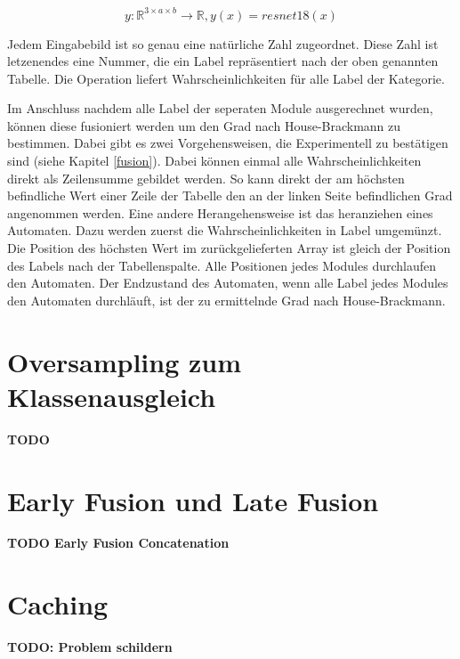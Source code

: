 \begin{equation}
y: \mathbb{R}^{3 \times a \times b} \to \mathbb{R}, y(x) = resnet18(x)
\end{equation}

Jedem Eingabebild ist so genau eine natürliche Zahl zugeordnet. Diese Zahl ist letzenendes eine Nummer, die ein Label repräsentiert nach der oben genannten Tabelle. Die Operation liefert Wahrscheinlichkeiten für alle Label der Kategorie.

Im Anschluss nachdem alle Label der seperaten Module ausgerechnet wurden, können diese fusioniert werden um den Grad nach House-Brackmann zu bestimmen. Dabei gibt es zwei Vorgehensweisen, die Experimentell zu bestätigen sind (siehe Kapitel \ref{fusion}). Dabei können einmal alle Wahrscheinlichkeiten direkt als Zeilensumme gebildet werden. So kann direkt der am höchsten befindliche Wert einer Zeile der Tabelle den an der linken Seite befindlichen Grad angenommen werden. Eine andere Herangehensweise ist das heranziehen eines Automaten. Dazu werden zuerst die Wahrscheinlichkeiten in Label umgemünzt. Die Position des höchsten Wert im zurückgelieferten Array ist gleich der Position des Labels nach der Tabellenspalte. Alle Positionen jedes Modules durchlaufen den Automaten. Der Endzustand des Automaten, wenn alle Label jedes Modules den Automaten durchläuft, ist der zu ermittelnde Grad nach House-Brackmann.

















\clearpage
\section{Oversampling zum Klassenausgleich}\label{oversamplingmethod}
\textbf{TODO}

\section{Early Fusion und Late Fusion}\label{fusionmethod}
\textbf{TODO Early Fusion Concatenation}








\clearpage
\section{Caching}\label{caching}
\textbf{TODO: Problem schildern}


